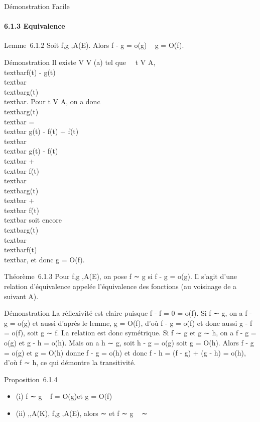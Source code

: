 Démonstration Facile

\paragraph{6.1.3 Equivalence}

Lemme~6.1.2 Soit f,g ,A(E). Alors f - g = o(g) \rigtharrow~ g = O(f).

Démonstration Il existe V \in V (a) tel que \forall~~t \in
V \bigcap A, \\textbar{}f(t) - g(t)\\textbar{}
 
\\textbar{}g(t)\\textbar{}. Pour t \in V \bigcap
A, on a donc \\textbar{}g(t)\\textbar{}
=\\textbar{} g(t) - f(t) + f(t)\\textbar{}
\leq\\textbar{} g(t) - f(t)\\textbar{}
+\\textbar{} f(t)\\textbar{} 
\\textbar{}g(t)\\textbar{}
+\\textbar{} f(t)\\textbar{} soit encore
\\textbar{}g(t)\\textbar{} \\textbar{}f(t)\\textbar{}, et donc g =
O(f).

Théorème~6.1.3 Pour f,g ,A(E), on pose f ∼ g si f - g =
o(g). Il s'agit d'une relation d'équivalence appelée l'équivalence des
fonctions (au voisinage de a suivant A).

Démonstration La réflexivité est claire puisque f - f = 0 = o(f). Si f ∼
g, on a f - g = o(g) et aussi d'après le lemme, g = O(f), d'où f - g =
o(f) et donc aussi g - f = o(f), soit g ∼ f. La relation est donc
symétrique. Si f ∼ g et g ∼ h, on a f - g = o(g) et g - h = o(h). Mais
on a h ∼ g, soit h - g = o(g) soit g = O(h). Alors f - g = o(g) et g =
O(h) donne f - g = o(h) et donc f - h = (f - g) + (g - h) = o(h), d'où f
∼ h, ce qui démontre la transitivité.

Proposition~6.1.4

\begin{itemize}
\itemsep1pt\parskip0pt
\item
  (i) f ∼ g \rigtharrow~ f = O(g)\text et g = O(f)
\item
  (ii) \phi,\psi {},A(K), f,g ,A(E), alors \phi ∼
  \psi\text et f ∼ g \rigtharrow~ \phif ∼ \psig
\end{itemize}

